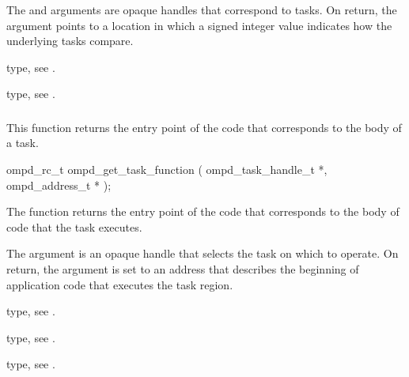 \argdesc
The  and  arguments are opaque handles
that correspond to tasks. On return, the  argument points to
a location in which a signed integer value indicates how the underlying tasks 
compare.

\begin{crossrefs}
\item {} type, see .

\item {} type, see .
\end{crossrefs}



\subsubsection{}
\label{subsubsubsec:ompd_get_task_function}

\summary
This  function returns the entry point of 
the code that corresponds to the body of a task.

\format
\begin{cspecific}
\begin{ompSyntax}
ompd_rc_t ompd_get_task_function (
  ompd_task_handle_t *,
  ompd_address_t *
);
\end{ompSyntax}
\end{cspecific}

\descr
The  function returns the entry point of the code
that corresponds to the body of code that the task executes.

\argdesc
The  argument is an opaque handle that selects the task 
on which to operate. On return, the  argument is set to
an address that describes the beginning of application code that executes 
the task region.

\begin{crossrefs}
\item {} type, see .

\item {} type, see .

\item {} type, see .
\end{crossrefs}



